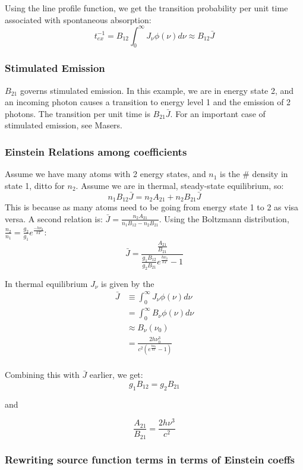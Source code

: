 \documentclass{article}
\def\eboltz{e^{\frac{-h\nu _0}{kT}}}
\def\eboltzplus{e^{\frac{h\nu _0}{kT}}}
\def\ato{{A_{21}}}
\def\bto{{B_{21}}}
\def\bot{{B_{12}}}
\def\Jbar{{\bar J}}
\def\ato{{A_{21}}}
\def\bto{{B_{21}}}
\def\bot{{B_{12}}}
\def\ato{{A_{21}}}
\def\bto{{B_{21}}}
\def\bot{{B_{12}}}
\begin{document}
Using the line profile function, we get the transition probability per unit time associated with spontaneous absorption:
\begin{equation}
t_{ex}^{-1}=\bot\int_0^\infty{J_\nu\phi(\nu)d\nu}\approx\bot\Jbar
\end{equation}

\subsubsection{Stimulated Emission}

$\bto$ governs stimulated emission.  In this example, we are in energy
state 2, and an incoming photon causes a transition to energy level 1 and the
emission of 2 photons.  The transition per unit time is $\bto\Jbar$. For an important case of stimulated emission, see Masers.

\subsubsection{ Einstein Relations among coefficients}

Assume we have many atoms with 2 energy states, and $n_1$ is the \# density
in state 1, ditto for $n_2$.  Assume we are in thermal, steady-state 
equilibrium, so:
$$n_1\bot\Jbar=n_2\ato+n_2\bto\Jbar$$
This is because as many atoms need to be
going from energy state 1 to 2 as visa versa.
A second relation is:
$\Jbar = \frac{n_2\ato}{n_1\bot-n_2\bto}$.
Using the Boltzmann distribution, $\frac{n_2}{n_1}=\frac{g_2}{ g_1}\eboltz$:
$$\Jbar=\frac{{{\frac{\ato}{\bto}}}}{{{{\frac{g_1\bot}{ g_2\bto}}}\eboltzplus-1}}$$

In thermal equilibrium $J_\nu$ is given by the 
$$\begin{aligned}\Jbar&\equiv\int_0^\infty{J_\nu\phi(\nu)d\nu}\\ 
&=\int_0^\infty{B_\nu\phi(\nu)d\nu}\\ 
&\approx B_\nu(\nu_0)\\ 
&=\frac{2h\nu_0^3}{c^2(\eboltzplus-1)}\\ \end{aligned}$$

Combining this with $\Jbar$ earlier, we get:
$$\boxed{g_1\bot=g_2\bto}$$
\centerline{and}
$$\frac{\ato}{\bto}=\frac{2h\nu^3}{ c^2}$$

\subsubsection{ Rewriting source function terms in terms of Einstein coeffs}
\end{document}
